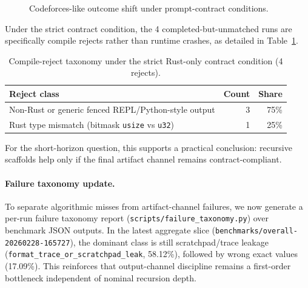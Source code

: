 \documentclass[11pt]{article}
\begin{document}
\begin{figure}[t]
\centering
{}
\caption{Codeforces-like outcome shift under prompt-contract conditions.}
\label{fig:cf-contract-shift}
\end{figure}

Under the strict contract condition, the 4 completed-but-unmatched runs are specifically compile rejects rather than runtime crashes, as detailed in Table~\ref{tab:cf-taxonomy}.

\begin{table}[t]
\centering
\caption{Compile-reject taxonomy under the strict Rust-only contract condition (4 rejects).}
\label{tab:cf-taxonomy}
\begin{tabular}{lrr}
\toprule
Reject class & Count & Share \\
\midrule
Non-Rust or generic fenced REPL/Python-style output & 3 & 75\% \\
Rust type mismatch (bitmask \texttt{usize} vs \texttt{u32}) & 1 & 25\% \\
\bottomrule
\end{tabular}
\end{table}

For the short-horizon question, this supports a practical conclusion: recursive scaffolds help only if the final artifact channel remains contract-compliant.

\paragraph{Failure taxonomy update.}
To separate algorithmic misses from artifact-channel failures, we now generate a per-run failure taxonomy report (\texttt{scripts/failure\_taxonomy.py}) over benchmark JSON outputs. In the latest aggregate slice (\texttt{benchmarks/overall-20260228-165727}), the dominant class is still scratchpad/trace leakage (\texttt{format\_trace\_or\_scratchpad\_leak}, 58.12\%), followed by wrong exact values (17.09\%). This reinforces that output-channel discipline remains a first-order bottleneck independent of nominal recursion depth.
\end{document}
